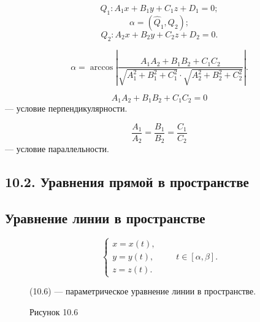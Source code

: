 \documentclass[12pt,a4paper]{article}
\newcommand{\vr}{\bar r}
\begin{document}
$$
Q_1:A_1x+B_1y+C_1z+D_1=0;
$$
$$
\alpha=(\hat Q_1,Q_2);
$$
$$
Q_2:A_2x+B_2y+C_2z+D_2=0.
$$

$$
\alpha=\arccos\left|
\frac{A_1A_2+B_1B_2+C_1C_2}
{\sqrt{A_1^2+B_1^2+C_1^2}\cdot\sqrt{A_2^2+B_2^2+C_2^2}}
\right|.
$$

$$
A_1A_2+B_1B_2+C_1C_2=0
$$
--- условие перпендикулярности.

$$
\frac{A_1}{A_2}=\frac{B_1}{B_2}=\frac{C_1}{C_2}
$$
--- условие параллельности.

\subsection*{10.2. Уравнения прямой в пространстве}

\subsection*{\textbf{Уравнение линии в пространстве}}

\begin{equation}
  \begin{cases}
    x=x(t),\\
    y=y(t),\\
    z=z(t).
  \end{cases}
  \qquad t\in[\alpha,\beta]. \tag{10.6}
\end{equation}

\begin{figure}[H]
  \centering
  \begin{minipage}{0.4\textwidth}
    \centering
    \caption*{Рисунок 10.6}
  \end{minipage}%
  \begin{minipage}{0.55\textwidth}
    (10.6) --- параметрическое уравнение линии в пространстве.
  \end{minipage}
\end{figure}
\end{document}
